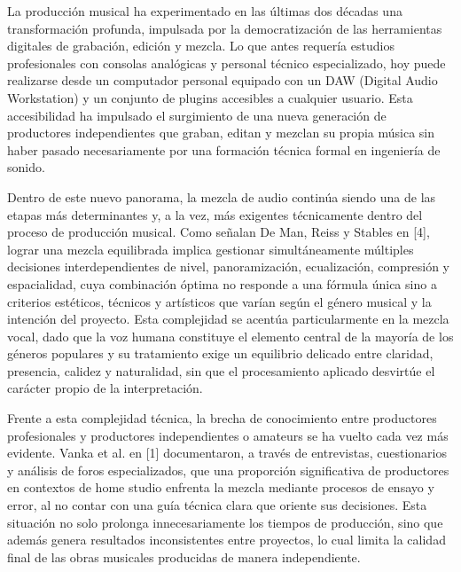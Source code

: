 La producción musical ha experimentado en las últimas dos décadas una transformación profunda, impulsada por la democratización de las herramientas digitales de grabación, edición y mezcla. Lo que antes requería estudios profesionales con consolas analógicas y personal técnico especializado, hoy puede realizarse desde un computador personal equipado con un DAW (Digital Audio Workstation) y un conjunto de plugins accesibles a cualquier usuario. Esta accesibilidad ha impulsado el surgimiento de una nueva generación de productores independientes que graban, editan y mezclan su propia música sin haber pasado necesariamente por una formación técnica formal en ingeniería de sonido.

Dentro de este nuevo panorama, la mezcla de audio continúa siendo una de las etapas más determinantes y, a la vez, más exigentes técnicamente dentro del proceso de producción musical. Como señalan De Man, Reiss y Stables en [4], lograr una mezcla equilibrada implica gestionar simultáneamente múltiples decisiones interdependientes de nivel, panoramización, ecualización, compresión y espacialidad, cuya combinación óptima no responde a una fórmula única sino a criterios estéticos, técnicos y artísticos que varían según el género musical y la intención del proyecto. Esta complejidad se acentúa particularmente en la mezcla vocal, dado que la voz humana constituye el elemento central de la mayoría de los géneros populares y su tratamiento exige un equilibrio delicado entre claridad, presencia, calidez y naturalidad, sin que el procesamiento aplicado desvirtúe el carácter propio de la interpretación.

Frente a esta complejidad técnica, la brecha de conocimiento entre productores profesionales y productores independientes o amateurs se ha vuelto cada vez más evidente. Vanka et al. en [1] documentaron, a través de entrevistas, cuestionarios y análisis de foros especializados, que una proporción significativa de productores en contextos de home studio enfrenta la mezcla mediante procesos de ensayo y error, al no contar con una guía técnica clara que oriente sus decisiones. Esta situación no solo prolonga innecesariamente los tiempos de producción, sino que además genera resultados inconsistentes entre proyectos, lo cual limita la calidad final de las obras musicales producidas de manera independiente.

